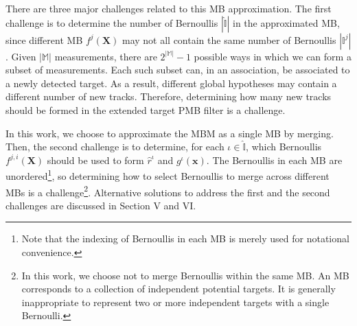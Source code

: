 \documentclass[journal]{IEEEtran}
\begin{document}
\begin{figure}[!t]
    \label{fig:example}
\end{figure}

There are three major challenges related to this MB approximation. The first challenge is to determine the number of Bernoullis $|\hat{\mathbb{I}}|$ in the approximated MB, since different MB $f^j(\mathbf{X})$ may not all contain the same number of Bernoullis $|\mathbb{I}^j|$. Given $|\mathbb{M}|$ measurements, there are $2^{|\mathbb{M}|}-1$ possible ways in which we can form a subset of measurements. Each such subset can, in an association, be associated to a newly detected target. As a result, different global hypotheses may contain a different number of new tracks. Therefore, determining how many new tracks should be formed in the extended target PMB filter is a challenge. 

In this work, we choose to approximate the MBM as a single MB by merging. Then, the second challenge is to determine, for each $\iota \in \hat{\mathbb{I}}$, which Bernoullis $f^{j,i}(\mathbf{X})$ should be used to form $\hat{r}^{\iota}$ and $g^{\iota}(\mathbf{x})$. The Bernoullis in each MB are unordered\footnote{Note that the indexing of Bernoullis in each MB is merely used for notational convenience.}, so determining how to select Bernoullis to merge across different MBs is a challenge\footnote{In this work, we choose not to merge Bernoullis within the same MB. An MB corresponds to a collection of independent potential targets. It is generally inappropriate to represent two or more independent targets with a single Bernoulli.}. Alternative solutions to address the first and the second challenges are discussed in Section V and VI.
\end{document}
